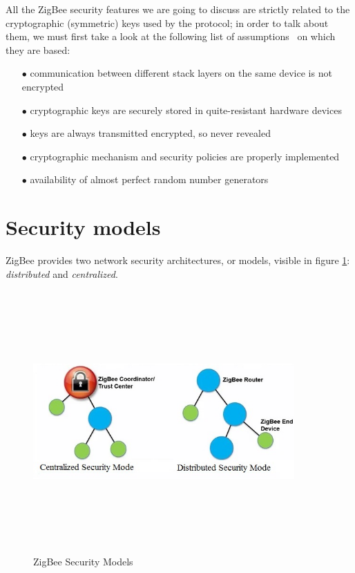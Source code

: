 \documentclass[12pt]{report}
\begin{document}
{{All the ZigBee security features we are going to discuss are strictly related to the cryptographic (symmetric) keys used by the protocol; in order to talk about them, we must first take a look at the following list of assumptions~\cite{secanalysisofzigbee} on which they are based:

\begin{itemize}
\setlength{\itemindent}{+4mm}
\item[$\bullet$] communication between different stack layers on the same device is not encrypted
\item[$\bullet$] cryptographic keys are securely stored in quite-resistant hardware devices
\item[$\bullet$] keys are always transmitted encrypted, so never revealed
\item[$\bullet$] cryptographic mechanism and security policies are properly implemented
\item[$\bullet$] availability of almost perfect random number generators\\
\end{itemize}

\clearpage
\section{Security models}
\bigskip

ZigBee provides two network security architectures, or models, visible in figure \ref{fig:zigbeemodels}: \emph{distributed} and \emph{centralized}.\\

\begin{figure}[H]
\includegraphics[width=10cm,height=10cm,keepaspectratio]{security_models}
\centering
\caption{ZigBee Security Models}
\label{fig:zigbeemodels}
\end{figure}

}}
\end{document}
